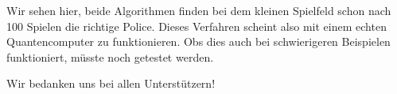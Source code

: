 Wir sehen hier, beide Algorithmen finden bei dem kleinen Spielfeld schon nach 100 Spielen die richtige Police. Dieses Verfahren scheint also mit einem echten Quantencomputer zu funktionieren. Obs dies auch bei schwierigeren Beispielen funktioniert, müsste noch getestet werden.

\newpage

\begin{acknowledgement}
Wir bedanken uns bei allen Unterstützern!
\end{acknowledgement}